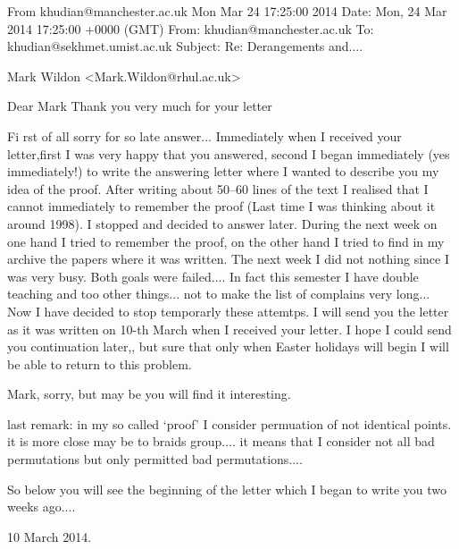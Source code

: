 From khudian@manchester.ac.uk Mon Mar 24 17:25:00 2014
Date: Mon, 24 Mar 2014 17:25:00 +0000 (GMT)
From: khudian@manchester.ac.uk
To: khudian@sekhmet.umist.ac.uk
Subject: Re: Derangements and....



   Mark Wildon <Mark.Wildon@rhul.ac.uk>



   Dear Mark
Thank you very much for your letter

        Fi rst of all sorry  for so late answer...
  Immediately when I received your  letter,first I was very 
happy that you answered, second I began immediately (yes immediately!) 
to write the answering letter where I 
wanted to describe you my idea of the proof. After writing about 50--60
 lines  of the  text I realised that I cannot immediately to remember 
the proof (Last time I was thinking about it around 1998).
I stopped and decided to answer 
later. During the next week
 on one hand I tried to remember the proof, on
the other hand I tried to find in my archive the 
papers where it was written.  The next week I did not nothing
since I was very busy. Both goals were failed.... 
In fact this semester I have double teaching
and too other things... not to make the list of complains very long...
  Now I have decided to stop temporarly these  attemtps.
I will send you the letter as it was written on 10-th March when
I received your letter. I hope I could send you continuation later,,
but sure that only when Easter holidays will begin I will be able to 
 return to this problem.

 Mark, sorry, but may be you will find it interesting.



last remark: in my so called `proof' 
I consider permuation of not identical points.
it is more close may be to braids group....
it means that I consider not all bad permutations but only
permitted bad permutations....

So below you will see the beginning of the letter which I began to write 
you two weeks ago....

10 March 2014.

